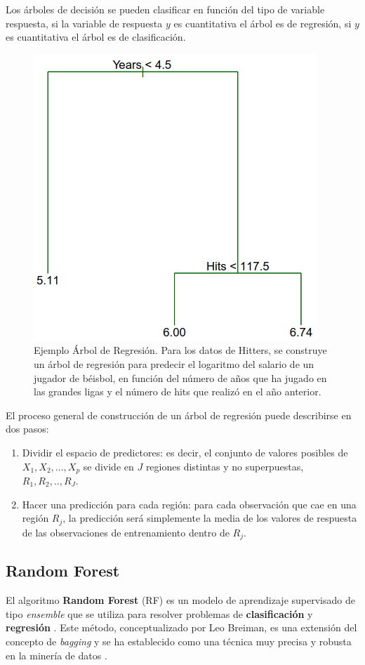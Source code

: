 Los árboles de decisión se pueden clasificar en función del tipo de variable respuesta, si la variable de respuesta $y$ es cuantitativa el árbol es de regresión, si $y$ es cuantitativa el árbol es de clasificación.

\begin{figure}
    \centering
    \includegraphics[width=0.25\linewidth]{figuras/tree_1.png}
    \caption{Ejemplo Árbol de Regresión. Para los datos de Hitters, se construye un árbol de regresión para predecir el logaritmo del salario de un jugador de béisbol, en función del número de años que ha jugado en las grandes ligas y el número de hits que realizó en el año anterior.}
    \label{fig:tree}
\end{figure}


El proceso general de construcción de un árbol de regresión puede describirse en dos pasos:
\begin{enumerate}
    \item  Dividir el espacio de predictores: es decir, el conjunto de valores posibles de $X_1, X_2, ..., X_p$ se divide en $J$ regiones distintas y no superpuestas, $R_1, R_2,..,R_J$.

    \item Hacer una predicción para cada región: para cada observación que cae en una región $R_j$, la predicción será simplemente la media de los valores de respuesta de las observaciones de entrenamiento dentro de $R_j$.
\end{enumerate}


\subsection{Random Forest}

El algoritmo \textbf{Random Forest} (RF) es un modelo de aprendizaje supervisado de tipo \textit{ensemble} que se utiliza para resolver problemas de \textbf{clasificaci\'on} y \textbf{regresi\'on} \cite{louppe2015, salman2024}. Este m\'etodo, conceptualizado por Leo Breiman, es una extensi\'on del concepto de \textit{bagging} y se ha establecido como una t\'ecnica muy precisa y robusta en la miner\'ia de datos \cite{cutler2011}.


